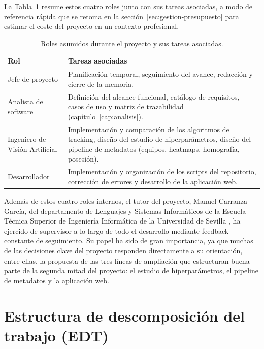 La Tabla~\ref{tab:gestion-roles} resume estos cuatro roles junto con sus
tareas asociadas, a modo de referencia rápida que se retoma en la
sección~\ref{sec:gestion-presupuesto} para estimar el coste del proyecto en
un contexto profesional.

\begin{table}[htp]
\centering
\caption{Roles asumidos durante el proyecto y sus tareas asociadas.}
\label{tab:gestion-roles}
\renewcommand{\arraystretch}{1.3}
\begin{tabular}{|p{3.1cm}|p{9.7cm}|}
\hline
\rowcolor{gray!25}
\textbf{Rol} & \textbf{Tareas asociadas} \\
\hline
Jefe de proyecto &
  Planificación temporal, seguimiento del avance, redacción y cierre de la
  memoria. \\
\hline
Analista de software &
  Definición del alcance funcional, catálogo de requisitos, casos de uso y
  matriz de trazabilidad (capítulo~\ref{cap:analisis}). \\
\hline
Ingeniero de Visión Artificial &
  Implementación y comparación de los algoritmos de tracking, diseño del
  estudio de hiperparámetros, diseño del pipeline de metadatos (equipos,
  heatmaps, homografía, posesión). \\
\hline
Desarrollador &
  Implementación y organización de los scripts del repositorio, corrección
  de errores y desarrollo de la aplicación web. \\
\hline
\end{tabular}
\end{table}

Además de estos cuatro roles internos, el tutor del proyecto, Manuel
Carranza García, del departamento de Lenguajes y Sistemas Informáticos de
la Escuela Técnica Superior de Ingeniería Informática de la Universidad de
Sevilla \cite{webETSII}, ha ejercido de supervisor a lo largo de todo el
desarrollo mediante feedback constante de seguimiento. Su papel ha sido de gran importancia, ya que muchas de las
decisiones clave del proyecto responden directamente a su orientación,
entre ellas, la propuesta de las tres
líneas de ampliación que estructuran buena parte de la segunda mitad del
proyecto: el estudio de hiperparámetros, el pipeline de metadatos y la
aplicación web.

\section{Estructura de descomposición del trabajo (EDT)}
\label{sec:gestion-edt}

